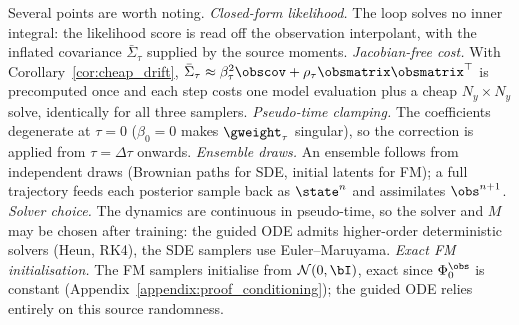 Several points are worth noting. \emph{Closed-form likelihood.} The loop solves no inner integral: the likelihood score is read off the observation interpolant, with the inflated covariance $\bar\Sigma_\tau$ supplied by the source moments. \emph{Jacobian-free cost.} With Corollary~\ref{cor:cheap_drift}, $\bar\Sigma_\tau\approx\beta_\tau^2\obscov+\rho_\tau\obsmatrix\obsmatrix^\top$ is precomputed once and each step costs one model evaluation plus a cheap $N_y\times N_y$ solve, identically for all three samplers. \emph{Pseudo-time clamping.} The coefficients degenerate at $\tau=0$ ($\beta_0=0$ makes $\gweight_\tau$ singular), so the correction is applied from $\tau=\Delta\tau$ onwards. \emph{Ensemble draws.} An ensemble follows from independent draws (Brownian paths for SDE, initial latents for FM); a full trajectory feeds each posterior sample back as $\state^{n}$ and assimilates $\obs^{n+1}$. \emph{Solver choice.} The dynamics are continuous in pseudo-time, so the solver and $M$ may be chosen after training: the guided ODE admits higher-order deterministic solvers (Heun, RK4), the SDE samplers use Euler--Maruyama. \emph{Exact FM initialisation.} The FM samplers initialise from $\mathcal{N}(0,\bI)$, exact since $\Phi_0^{\obs}$ is constant (Appendix~\ref{appendix:proof_conditioning}); the guided ODE relies entirely on this source randomness.
